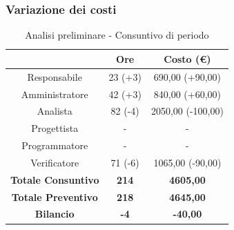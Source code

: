 \subsubsection{Variazione dei costi} \label{subsubsection:variazione_costi_analisi}
\begin{table}[H]
  \centering
  \renewcommand{\arraystretch}{1.8}
  \begin{tabular}{c|c|c}
    \rowcolor[HTML]{125E28}
    \multicolumn{1}{c}{\color[HTML]{FFFFFF}\textbf{Ruolo}}
                               & \multicolumn{1}{c}{\color[HTML]{FFFFFF}\textbf{Ore}}
                               & \multicolumn{1}{c}{\color[HTML]{FFFFFF}\textbf{Costo (€)}}                     \\
    \hline
    Responsabile               & 23 (+3)                                                    & 690,00 (+90,00)   \\
    Amministratore             & 42 (+3)                                                    & 840,00 (+60,00)   \\
    Analista                   & 82 (-4)                                                    & 2050,00 (-100,00) \\
    Progettista                & -                                                          & -                 \\
    Programmatore              & -                                                          & -                 \\
    Verificatore               & 71 (-6)                                                    & 1065,00 (-90,00)  \\
    \textbf{Totale Consuntivo} & \textbf{214}                                               & \textbf{4605,00}  \\
    \textbf{Totale Preventivo} & \textbf{218}                                               & \textbf{4645,00}  \\
    \textbf{Bilancio}          & \textbf{-4}                                                & \textbf{-40,00}   \\
  \end{tabular}
  \caption{Analisi preliminare - Consuntivo di periodo}
\end{table}


